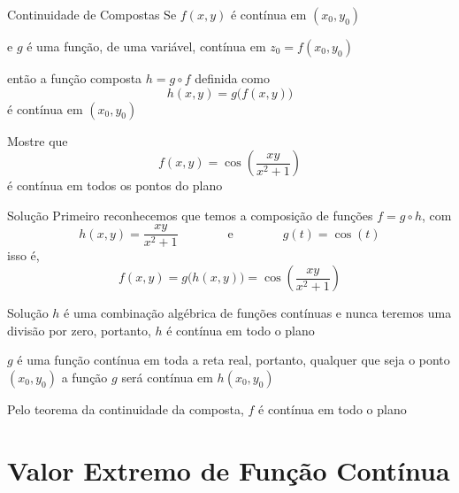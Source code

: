 \documentclass[fleqn,utf8,aspectratio=169,12pt,ignorenonframetext]{beamer}
\begin{document}
\begin{frame}{Continuidade de Compostas}
  Se $f(x, y)$ é contínua em $(x_0, y_0)$

  \pause
  e $g$ é uma função, de uma variável, contínua em $z_0 = f(x_0, y_0)$

  \pause
  então a função composta
  \(
    h = g\circ f
  \)
  \pause
  definida como
  \[
    h(x, y) = g\big(f(x, y)\big)
  \]
  \pause
  é contínua em $(x_0, y_0)$
\end{frame}

\begin{question}
  Mostre que
  \[
    f(x, y) = \cos\left(\frac{xy}{x^2+1}\right)
  \]
  é contínua em todos os pontos do plano
\end{question}

\begin{resolution}{Solução}
  Primeiro reconhecemos que temos a composição de funções $f=g\circ h$,
  \pause
  com
  \[
    h(x, y) = \frac{xy}{x^2+1}
    \qquad\qquad\text{e}\qquad\qquad
    g(t) = \cos(t)
  \]
  \pause
  isso é,
  \[
    f(x, y) = g\big(h(x, y)\big) = \cos\left(\frac{xy}{x^2+1}\right)
  \]
\end{resolution}

\begin{resolution}{Solução}
  $h$ é uma combinação algébrica de funções contínuas e nunca teremos
  uma divisão por zero, portanto, $h$ é contínua em todo o plano

  \pause
  \vspace{\baselineskip}
  $g$ é uma função contínua em toda a reta real, portanto, qualquer que seja o ponto
  $(x_0, y_0)$ a função $g$ será contínua em $h(x_0, y_0  )$

  \pause
  \vspace{\baselineskip}
  Pelo teorema da continuidade da composta, $f$ é contínua em todo o plano
\end{resolution}

\section{Valor Extremo de Função Contínua}
\end{document}
